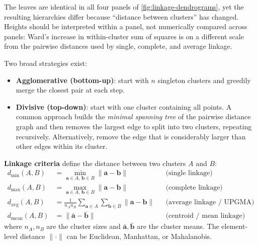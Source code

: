 \documentclass[11pt, oneside]{book}
\begin{document}
The leaves are identical in all four panels of \cref{fig:linkage-dendrograms},
yet the resulting hierarchies differ because ``distance between clusters'' has
changed. Heights should be interpreted within a panel, not numerically compared
across panels: Ward's increase in within-cluster sum of squares is on a different
scale from the pairwise distances used by single, complete, and average linkage.

Two broad strategies exist:
\begin{itemize}
  \item \textbf{Agglomerative (bottom-up)}: start with $n$ singleton clusters
        and greedily merge the closest pair at each step.
  \item \textbf{Divisive (top-down)}: start with one cluster containing all
        points.
        A common approach builds the \emph{minimal spanning tree} of the
        pairwise distance graph and then removes the largest edge to split
        into two clusters, repeating recursively.
        Alternatively, remove the edge that is considerably larger than
        other edges within its cluster.
\end{itemize}

\textbf{Linkage criteria} define the distance between two clusters $A$ and $B$:
\begin{align*}
  d_{\min}(A,B)  &= \min_{\bm{a}\in A,\,\bm{b}\in B}\|\bm{a}-\bm{b}\|
                  & &\text{(single linkage)}\\
  d_{\max}(A,B)  &= \max_{\bm{a}\in A,\,\bm{b}\in B}\|\bm{a}-\bm{b}\|
                  & &\text{(complete linkage)}\\
  d_{\text{avg}}(A,B) &= \frac{1}{n_A n_B}\sum_{\bm{a}\in A}\sum_{\bm{b}\in B}
                         \|\bm{a}-\bm{b}\|
                  & &\text{(average linkage / UPGMA)}\\
  d_{\text{mean}}(A,B) &= \|\bar{\bm{a}}-\bar{\bm{b}}\|
                  & &\text{(centroid / mean linkage)}
\end{align*}
where $n_A,n_B$ are the cluster sizes and $\bar{\bm{a}},\bar{\bm{b}}$ are
the cluster means.
The element-level distance $\|\cdot\|$ can be Euclidean, Manhattan, or
Mahalanobis.
\end{document}
